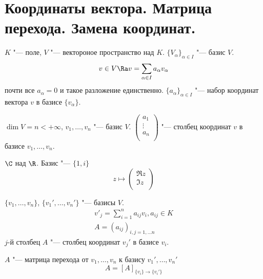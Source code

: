﻿\section[Коор-ты вектора. Матрица перехода. Замена коор-т]{Координаты вектора. Матрица перехода. Замена координат.}

\begin{Def}
	$K$ "---  поле, $V$ "--- вектороное пространство над $K$.
	$\{V_{\alpha}\}_{\alpha \in I}$ "--- базис $V$.
	\[ v \in V \Ra v = \sum_{\alpha \in I}a_{\alpha}v_{\alpha} \]
	почти все $a_{\alpha} = 0$ и такое разложение единственно.
	$\{a_{\alpha}\}_{\alpha \in I}$ "--- набор координат вектора $v$ в базисе $\{v_{\alpha}\}$.
\end{Def}

\begin{Def}
	$\dim V = n < +\infty$, $v_1, \dots, v_n$ "--- базис $V$.
	$
		\begin{pmatrix}
			a_1\\
			\vdots\\
		a_n\\
		\end{pmatrix}
	$ "--- столбец координат $v$ в базисе $v_1, \dots, v_n$.
\end{Def}

\begin{exmp}
	$\C$ над $\R$. Базис "--- $\{1, i\}$
	\[
		z \mapsto
		\begin{pmatrix}
			\Re z\\
			\Im z\\
		\end{pmatrix}
	\]
\end{exmp}

\begin{Def}
	$\{v_1, \dots, v_n\}$, $\{v_1', \dots, v_n'\}$ "--- базисы $V$.
	\begin{gather*}
		v'_j = \sum_{i = 1}^{n}a_{ij}v_i, a_{ij}\in K \\
		A = (a_{ij})_{i, j = 1, \dots n}
	\end{gather*}
	$j$-й столбец $A$ "--- столбец координат $v_j'$ в базисе $v_i$.

	$A$ "--- матрица перехода от $v_1, \dots, v_n$ к базису $v_1', \dots, v_n'$
	\[ A = [A]_{\{v_i\} \to \{v_i'\}} \]
\end{Def}

